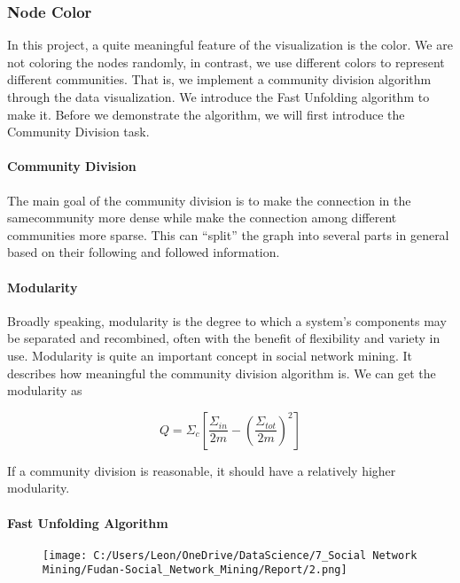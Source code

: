 \documentclass[]{article}
\let\oldparagraph\paragraph
\renewcommand{\paragraph}[1]{\oldparagraph{#1}\mbox{}}
\begin{document}
\hypertarget{header-n167}{%
\subsubsection{Node Color}\label{header-n167}}

In this project, a quite meaningful feature of the visualization is the
color. We are not coloring the nodes randomly, in contrast, we use
different colors to represent different communities. That is, we
implement a community division algorithm through the data visualization.
We introduce the Fast Unfolding algorithm to make it. Before we
demonstrate the algorithm, we will first introduce the Community
Division task.

\hypertarget{header-n170}{%
\paragraph{Community Division}\label{header-n170}}

The main goal of the community division is to make the connection in the
samecommunity more dense while make the connection among different
communities more sparse. This can ``split'' the graph into several parts
in general based on their following and followed information.\\

\hypertarget{header-n173}{%
\paragraph{Modularity}\label{header-n173}}

Broadly speaking, modularity is the degree to which a system's
components may be separated and recombined, often with the benefit of
flexibility and variety in use. Modularity is quite an important concept
in social network mining. It describes how meaningful the community
division algorithm is. We can get the modularity as

\[Q =Σ_c  [ \frac{Σ_{in}}{2m}−(\frac{Σ_{tot}}{2m})^2]\]

If a community division is reasonable, it should have a relatively
higher modularity.

\hypertarget{header-n179}{%
\paragraph{Fast Unfolding Algorithm}\label{header-n179}}

\begin{figure}
\centering
\texttt{[image: C:/Users/Leon/OneDrive/DataScience/7\_Social Network Mining/Fudan-Social\_Network\_Mining/Report/2.png]}
\caption{}
\end{figure}
\end{document}
